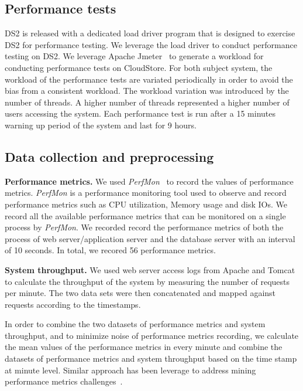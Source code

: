 \subsection{Performance tests}

DS2 is released with a dedicated load driver program that is designed to exercise DS2 for performance testing. We leverage the load driver to conduct performance testing on DS2. We leverage Apache Jmeter~\cite{apachejmeter} to generate a workload for conducting performance tests on CloudStore. For both subject system, the workload of the performance tests are variated periodically in order to avoid the bias from a consistent workload. The workload variation was introduced by the number of threads. A higher number of threads represented a higher number of users accessing the system. Each performance test is run after a 15 minutes warning up period of the system and last for 9 hours. 





\subsection{Data collection and preprocessing}

\noindent \textbf{Performance metrics.} We used \textit{PerfMon}~\cite{perfmon} to record the values of performance metrics. \textit{PerfMon} is a performance monitoring tool used to observe and record performance metrics such as CPU utilization, Memory usage and disk IOs. We record all the available performance metrics that can be monitored on a single process by \emph{PerfMon}.  We recorded record the performance metrics of both the process of web server/application server and the database server with an interval of 10 seconds. In total, we recored 56 performance metrics. 

\noindent \textbf{System throughput.} We used web server access logs from Apache and Tomcat to calculate the throughput of the system by measuring the number of requests per minute. The two data sets were then concatenated and mapped against requests according to the timestamps.

In order to combine the two datasets of performance metrics and system throughput, and to minimize noise of performance metrics recording, we calculate the mean values of the performance metrics in every minute and combine the datasets of performance metrics and system throughput based on the time stamp at minute level. Similar approach has been leverage to address mining performance metrics challenges~\cite{foo2010mining}.
